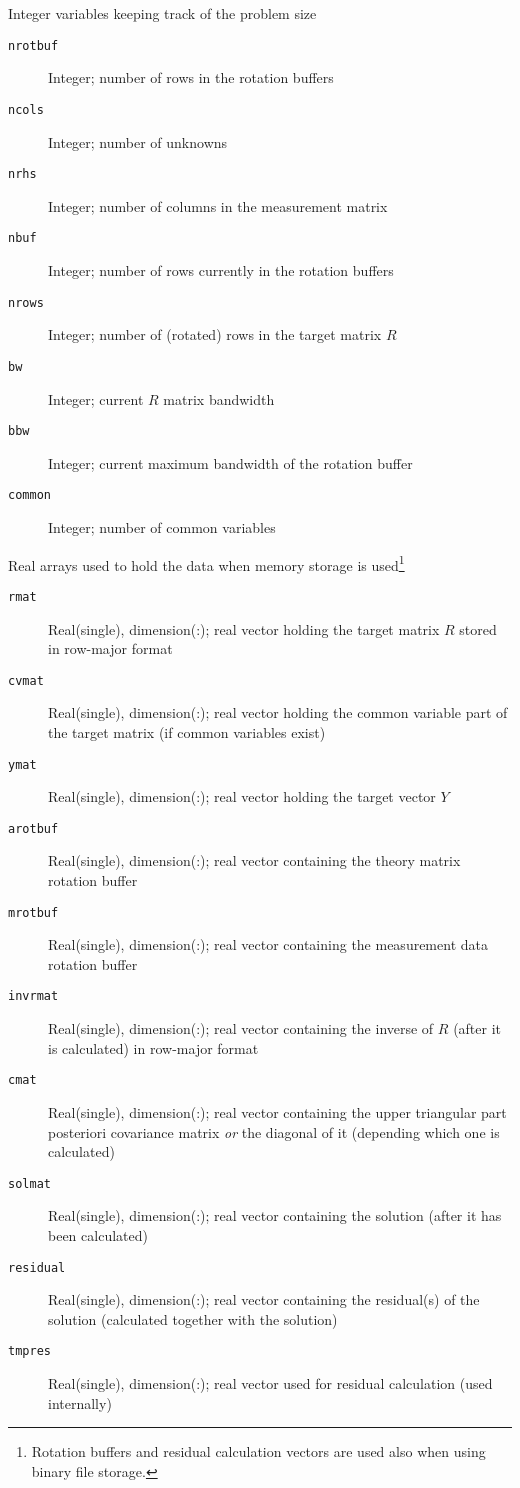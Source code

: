 \documentclass[a4paper,twoside]{refrep}
\newcommand{\aitem}[1]{\item[{\tt #1}]}
\newenvironment{arglist}
	{\begin{description}}
	{\end{description}}
\begin{document}
 Integer variables keeping track of the problem size
\begin{arglist}
\aitem{nrotbuf} Integer; number of rows in the rotation buffers
\aitem{ncols} Integer; number of unknowns
\aitem{nrhs} Integer; number of columns in the measurement matrix
\aitem{nbuf} Integer; number of rows currently in the rotation buffers
\aitem{nrows} Integer; number of (rotated) rows in the target matrix $R$
\aitem{bw} Integer; current $R$ matrix bandwidth
\aitem{bbw} Integer; current maximum bandwidth of the rotation buffer
\aitem{common} Integer; number of common variables
\end{arglist}

 Real arrays used to hold the data when memory storage is used\footnote{Rotation buffers and residual calculation vectors are used also when using binary file storage.}

\begin{arglist}
\aitem{rmat} Real(single), dimension(:); real vector holding the target matrix $R$ stored in row-major format
\aitem{cvmat} Real(single), dimension(:); real vector holding the common variable part of the target matrix (if common variables exist)
\aitem{ymat} Real(single), dimension(:); real vector holding the target vector $Y$
\aitem{arotbuf} Real(single), dimension(:); real vector containing the theory matrix rotation buffer
\aitem{mrotbuf} Real(single), dimension(:); real vector containing the measurement data rotation buffer
\aitem{invrmat} Real(single), dimension(:); real vector containing the inverse of $R$ (after it is calculated) in row-major format
\aitem{cmat} Real(single), dimension(:); real vector containing the upper triangular part posteriori covariance matrix \emph{or} the diagonal of it (depending which one is calculated)
\aitem{solmat} Real(single), dimension(:); real vector containing the solution (after it has been calculated)
\aitem{residual} Real(single), dimension(:); real vector containing the residual(s) of the solution (calculated together with the solution)
\aitem{tmpres} Real(single), dimension(:); real vector used for residual calculation (used internally)
\end{arglist}
\end{document}
